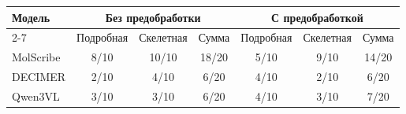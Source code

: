 \begin{tabular}{l c c c c c c}
	\hline
	\multirow{2}{*}{Модель} & \multicolumn{3}{c}{Без предобработки} & \multicolumn{3}{c}{С предобработкой} \\
	\cline{2-7}
	& Подробная & Скелетная & Сумма & Подробная & Скелетная & Сумма \\
	\hline
	MolScribe & 8/10 & 10/10 & 18/20 & 5/10 & 9/10 & 14/20 \\
	DECIMER   & 2/10 & 4/10  & 6/20  & 4/10 & 2/10 & 6/20 \\
	Qwen3VL   & 3/10 & 3/10  & 6/20  & 4/10 & 3/10 & 7/20 \\
	\hline
\end{tabular}
